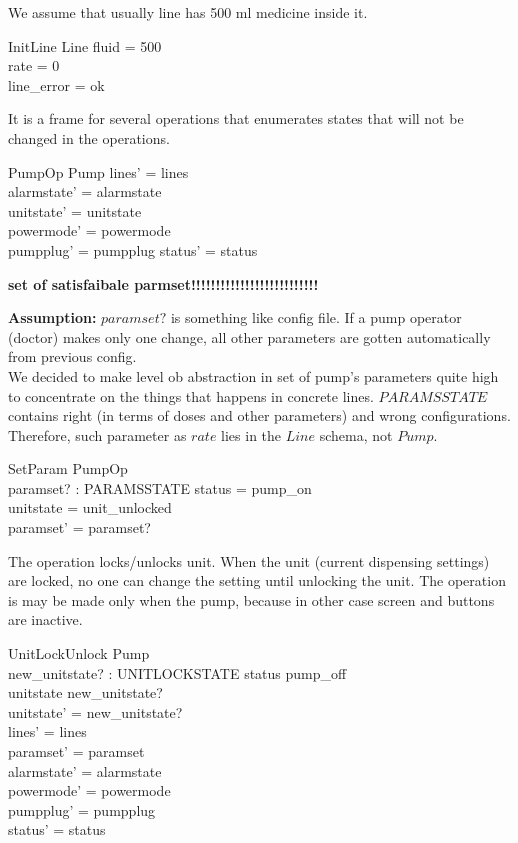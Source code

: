 \documentclass{article}
\begin{document}
	We assume that usually line has 500 ml medicine inside it.
	\begin{schema}{InitLine}
		Line
		\where
		fluid = 500 \\
		rate = 0 \\
		line\_error = ok \\
	\end{schema}

	It is a frame for several operations that enumerates states that will not be changed in the operations.
	\begin{schema}{PumpOp}
		\Delta Pump
	\where
    	lines' = lines  \\
    	alarmstate' = alarmstate \\
    	unitstate' = unitstate \\
    	powermode' = powermode \\
    	pumpplug' = pumpplug
    	status' = status \\
    \end{schema}
	

	\textbf{set of satisfaibale parmset!!!!!!!!!!!!!!!!!!!!!!!!!!}
	
	\textbf{Assumption:}  $paramset?$ is something like config file. If a pump operator (doctor) makes only one change, all other parameters are gotten automatically from previous config.\\
	We decided to make level ob abstraction in set of pump's parameters quite high to concentrate on the things that happens in concrete lines. $PARAMSSTATE$ contains right (in terms of doses and other parameters) and wrong configurations. Therefore, such parameter as $rate$ lies in the $Line$ schema, not $Pump$.
	\begin{schema}{SetParam}
		PumpOp \\
		paramset? : PARAMSSTATE 
	\where
		status = pump\_on \\ 
		unitstate = unit\_unlocked \\
		paramset' = paramset?
	\end{schema}

	
		The operation locks/unlocks unit. When the unit (current dispensing settings) are locked, no one can change the setting until unlocking the unit. The operation is may be made only when the pump, because in other case screen and buttons are inactive.\\
    \begin{schema}{UnitLockUnlock}
		\Delta Pump \\
		new\_unitstate? : UNITLOCKSTATE
	\where
		status \neq pump\_off \\ 
		unitstate \neq new\_unitstate? \\
		unitstate' = new\_unitstate? \\
    	lines' = lines  \\
    	paramset' = paramset\\
    	alarmstate' = alarmstate \\
    	powermode' = powermode \\
    	pumpplug' = pumpplug \\
    	status' = status \\	
	\end{schema}
\end{document}
